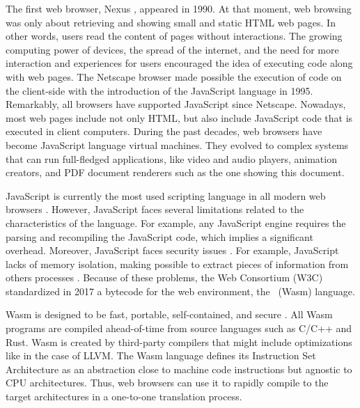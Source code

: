 {
	\color{red}
The first web browser, Nexus \cite{nexus}, appeared in 1990.
At that moment, web browsing was only about retrieving and showing small and static HTML web pages.
In other words, users read the content of pages without interactions.
The growing computing power of devices, the spread of the internet, and the need for more interaction and experiences for users encouraged the idea of executing code along with web pages.
The Netscape browser made possible the execution of code on the client-side with the introduction of the JavaScript \cite{10.1007/978-3-642-14107-2_7} language in 1995.
Remarkably, all browsers have supported JavaScript since Netscape. 
Nowadays, most web pages include not only HTML, but also include JavaScript code that is executed in client computers.
During the past decades, web browsers have become JavaScript language virtual machines. 
They evolved to complex systems that can run full-fledged applications, like video and audio players, animation creators, and PDF document renderers such as the one showing this document.



JavaScript is currently the most used scripting language in all modern web browsers \cite{mulazzani2013fast}. 
However, JavaScript faces several limitations related to the characteristics of the language. For example, any JavaScript engine requires the parsing and recompiling the JavaScript code, which implies a significant overhead.
Moreover, JavaScript faces security issues \cite{10.1145/1190216.1190252}.
For example, JavaScript lacks of memory isolation, making possible to extract pieces of information from others processes \cite{10.1145/3412841.3442001}.
Because of these problems, the Web Consortium (W3C) standardized in 2017 a bytecode for the web environment, the \wasm\ (Wasm) language. 

Wasm is designed to be fast, portable, self-contained, and secure \cite{Haas_2017}.
All Wasm programs are compiled ahead-of-time from source languages such as C/C++ and Rust.
Wasm is created by third-party compilers that might include optimizations like in the case of LLVM.  
The Wasm language defines its Instruction Set Architecture \cite{wasm_spec} as an abstraction close to machine code instructions but agnostic to CPU architectures. Thus,  web browsers can use it to rapidly compile to the target architectures in a one-to-one translation process.

}
